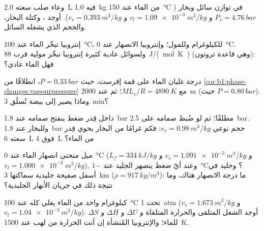 \begin{exercise}[$\star$]\label{exo:b1:phase-changes:3}
وعاء صلب سعته \qty{2.0}{L} فيه \qty{1.0}{kg} من الماء عند
\qty{150}{\degreeCelsius} في توازن سائل وبخار ($P_s =
\qty{4.76}{bar}$ و $v_l = \qty{1.09e-3}{m^3/kg}$ و $v_v = \qty{0.393}{m^3/kg}$).
أوجد ، وكتلة البخار، والحجم الذي يشغله السائل.
\end{exercise}

\begin{exercise}[$\star$]\label{exo:b1:phase-changes:4}
إنتروبيا تبخّر الماء عند \qty{100}{\degreeCelsius}، للكيلوغرام
وللمول؛ وإنتروبيا الانصهار  عند \qty{0}{\degreeCelsius}. ولسوائل
عادية كثيرة إنتروبيا تبخّر مولية قرب
\qty{88}{J/(mol.K)} (وهي قاعدة تروتون): فهل الماء عادي؟
\end{exercise}

\begin{exercise}[$\star\star$]\label{exo:b1:phase-changes:5}
درجة غليان الماء على قمة إفرست، حيث $P =
\qty{0.33}{bar}$، انطلاقًا من \cref{cor:b1:phase-changes:vapourpressure} مع
$ML_v/R = \qty{4890}{K}$؛ ثم عند \qty{2000}{m} (حيث $P = \qty{0.80}{bar}$). وماذا
يصير إلى بيضة تُسلَق \qty{3}{min}؟
\end{exercise}

\begin{exercise}[$\star\star$]\label{exo:b1:phase-changes:6}
 داخل قِدر ضغط ينفتح صمامه عند \qty{1.8}{bar}
مطلقًا؛ ثم لو ضُبط صمامه على \qty{2.5}{bar}. وللبخار عند
\qty{1.8}{bar} حجم نوعي $v_v = \qty{0.98}{m^3/kg}$: فكم غرامًا من البخار
يحوي قِدر سعته \qty{6}{L} فوق \qty{4}{L} من الماء؟
\end{exercise}

\begin{exercise}[$\star\star$]\label{exo:b1:phase-changes:7}
ميل منحني انصهار الماء عند \qty{0}{\degreeCelsius} ($L_f =
\qty{334}{kJ/kg}$ و $v_s = \qty{1.091e-3}{m^3/kg}$ و $v_l = \qty{1.000e-3}{m^3/kg}$).
وعند أيّ ضغط ينصهر الجليد عند \qty{-1}{\degreeCelsius}؟ وجليد في
أسفل صفيحة جليدية سماكتها \qty{3}{km} ($\rho = \qty{917}{kg/m^3}$): ما درجة
الانصهار هناك، وما نتيجة ذلك في جريان الأنهار الجليدية؟
\end{exercise}

\begin{exercise}[$\star\star$]\label{exo:b1:phase-changes:8}
كيلوغرام واحد من الماء يغلي كله عند \qty{100}{\degreeCelsius} تحت
\qty{1}{atm} ($v_v = \qty{1.673}{m^3/kg}$ و $v_l = \qty{1.04e-3}{m^3/kg}$).
أوجد الشغل المتلقى والحرارة المتلقاة و $\Delta U$ و $\Delta H$ و $\Delta S$
للماء؛ والإنتروبيا المُنشأة إن أتت الحرارة من لهب عند
\qty{1500}{K}.
\end{exercise}

